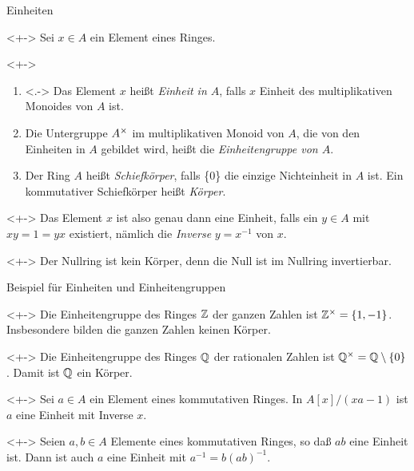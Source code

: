 \begin{frame}{Einheiten}
    \begin{visibleenv}<+->
        Sei \(x \in A\) ein Element eines Ringes.
    \end{visibleenv}
    \begin{definition}<+->
        \begin{enumerate}[<+->]
        \item<.->
            Das Element \(x\) heißt \emph{Einheit in \(A\)}, falls \(x\) 
            Einheit des multiplikativen Monoides von \(A\) ist.
        \item<+->
            Die Untergruppe \(A^\times\) im multiplikativen Monoid von \(A\), die
            von den Einheiten in \(A\) gebildet wird, heißt die
            \emph{Einheitengruppe von \(A\)}.
        \item
            Der Ring \(A\) heißt \emph{Schiefkörper}, falls \{0\} die einzige
            Nichteinheit in \(A\) ist. Ein kommutativer Schiefkörper heißt
            \emph{Körper}.
        \end{enumerate}       
    \end{definition}
    \begin{visibleenv}<+->
        Das Element \(x\) ist also genau dann eine Einheit, falls ein \(y \in A\) mit
        \(x y = 1 = y x\) existiert, nämlich die \emph{Inverse} \(y = x^{-1}\)
        von \(x\).
    \end{visibleenv}
    \begin{example}<+->
        Der Nullring ist kein Körper, denn die Null ist im Nullring invertierbar.
    \end{example}
\end{frame}

\begin{frame}{Beispiel für Einheiten und Einheitengruppen}
    \begin{example}<+->
        Die Einheitengruppe des Ringes \(\mathbb Z\) der ganzen Zahlen ist
        \(\mathbb Z^\times = \{1, -1\}\). 
        Insbesondere bilden die ganzen Zahlen keinen Körper.
    \end{example}
    \begin{example}<+->
        Die Einheitengruppe des Ringes \(\mathbb Q\) der rationalen Zahlen ist
        \(\mathbb Q^\times = \mathbb Q \setminus \{0\}\). Damit ist \(\mathbb Q\) ein
        Körper.
    \end{example}
    \begin{example}<+->
        Sei \(a \in A\) ein Element eines kommutativen Ringes. In \(A[x]/(xa - 1)\)
        ist \(a\) eine Einheit mit Inverse \(x\).
    \end{example}
    \begin{example}<+->
        Seien \(a, b \in A\) Elemente eines kommutativen Ringes, so daß \(ab\)
        eine Einheit ist.
        Dann ist auch \(a\) eine Einheit mit \(a^{-1} = b (ab)^{-1}\). 
    \end{example}
\end{frame}


